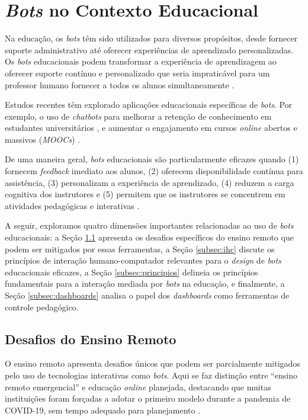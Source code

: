 \section{\textit{Bots} no Contexto Educacional} \label{sec:bots-educ}

Na educação, os \textit{bots} têm sido utilizados para diversos propósitos,
desde fornecer suporte administrativo até oferecer experiências de aprendizado
personalizadas. Os \textit{bots} educacionais podem transformar a experiência de
aprendizagem ao oferecer suporte contínuo e personalizado que seria impraticável
para um professor humano fornecer a todos os alunos simultaneamente
\cite{zawacki2019}.

Estudos recentes têm explorado aplicações educacionais específicas de
\textit{bots}. Por exemplo, o uso de \textit{chatbots} para melhorar a retenção
de conhecimento em estudantes universitários \cite{okonkwo2021}, e aumentar o
engajamento em cursos \textit{online} abertos e massivos (\textit{MOOCs})
\cite{han2022}.

De uma maneira geral, \textit{bots} educacionais são particularmente eficazes
quando (1) fornecem \textit{feedback} imediato aos alunos, (2) oferecem
disponibilidade contínua para assistência, (3) personalizam a experiência de
aprendizado, (4) reduzem a carga cognitiva dos instrutores e (5) permitem que os
instrutores se concentrem em atividades pedagógicas e interativas
\cite{silva2024}.

A seguir, exploramos quatro dimensões importantes relacionadas ao uso de
\textit{bots} educacionais: a Seção \ref{subsec:desafios} apresenta os desafios
específicos do ensino remoto que podem ser mitigados por essas ferramentas, a
Seção \ref{subsec:ihc} discute os princípios de interação humano-computador
relevantes para o \textit{design} de \textit{bots} educacionais eficazes, a
Seção \ref{subsec:principios} delineia os princípios fundamentais para a
interação mediada por \textit{bots} na educação, e finalmente, a Seção
\ref{subsec:dashboards} analisa o papel dos \textit{dashboards} como ferramentas
de controle pedagógico.

\subsection{Desafios do Ensino Remoto} \label{subsec:desafios}

O ensino remoto apresenta desafios únicos que podem ser parcialmente mitigados
pelo uso de tecnologias interativas como \textit{bots}. Aqui se faz distinção entre
``ensino remoto emergencial'' e educação \textit{online} planejada, destacando que
muitas instituições foram forçadas a adotar o primeiro modelo durante a pandemia
de COVID-19, sem tempo adequado para planejamento
\cite{hodges2020,fabiane2024}.

